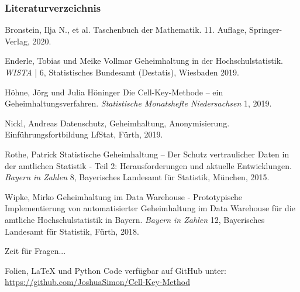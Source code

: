 \documentclass[aspectratio=169]{beamer}
\begin{document}
\begin{frame}
    \frametitle{Literaturverzeichnis}
    \footnotesize{
        \begin{thebibliography}{99} %
              Bronstein, Ilja N., et al. 
            \newblock Taschenbuch der Mathematik. 11. Auflage, Springer-Verlag, 2020.

             Enderle, Tobias und Meike Vollmar
            \newblock Geheimhaltung in der Hochschulstatistik. \emph{WISTA} | 6, Statistisches Bundesamt (Destatis), Wiesbaden 2019.

             Höhne, Jörg und Julia Höninger
            \newblock Die Cell-Key-Methode – ein Geheimhaltungsverfahren. \emph{Statistische Monatshefte Niedersachsen} 1, 2019.

             Nickl, Andreas
            \newblock Datenschutz, Geheimhaltung, Anonymisierung. Einführungsfortbildung LfStat, Fürth, 2019.

             Rothe, Patrick
            \newblock Statistische Geheimhaltung – Der Schutz vertraulicher Daten in der amtlichen Statistik - Teil 2: Herausforderungen und aktuelle Entwicklungen. \emph{Bayern in Zahlen} 8, Bayerisches Landesamt für Statistik, München, 2015.

             Wipke, Mirko
            \newblock Geheimhaltung im Data Warehouse - Prototypische Implementierung von automatisierter Geheimhaltung im Data Warehouse für die amtliche Hochschulstatistik in Bayern. \emph{Bayern in Zahlen} 12, Bayerisches Landesamt für Statistik, Fürth, 2018.

        \end{thebibliography}
    }
\end{frame}


\begin{frame}
    \Huge{\centerline{Zeit für Fragen...}}
    \bigskip
    \bigskip
    \bigskip
    \bigskip

    \normalsize
    \centering
    Folien, \LaTeX \: und Python Code verfügbar auf GitHub  unter:
    \url{https://github.com/JoshuaSimon/Cell-Key-Method}
    \newline
    \newline

    
    
\end{frame}

\end{document}
